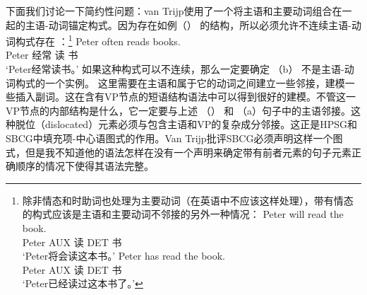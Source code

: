 下面我们讨论一下简约性问题：van Trijp使用了一个将主语和主要动词组合在一起的主语-动词锚定构式。因为存在如例（） 的结构，所以必须允许不连续主语-动词构式存在 ：\footnote{
除非情态和时助词也处理为主要动词（在英语中不应该这样处理），带有情态的构式应该是主语和主要动词不邻接的另外一种情况：
  \eal
  \ex 
\gll Peter will read the book.\\
    Peter AUX 读 DET 书\\
\glt `Peter将会读这本书。'
  \ex 
\gll Peter has read the book.\\
    Peter AUX 读 DET 书\\
\glt `Peter已经读过这本书了。'
  \zllast
} 
\ea
\gll Peter often reads books.\\
     Peter 经常 读 书\\
\glt `Peter经常读书。'
\z
如果这种构式可以不连续，那么一定要确定 （b） 不是主语-动词构式的一个实例。
\eal
{}
\zl
这里需要在主语和属于它的动词之间建立一些邻接，建模一些插入副词。这在含有VP节点的短语结构语法中可以得到很好的建模。不管这一VP节点的内部结构是什么，它一定要与上述  （） 和 （a）句子中的主语邻接。这种脱位（dislocated）元素必须与包含主语和VP的复杂成分邻接。这正是HPSG和SBCG中填充项-中心语图式的作用。Van Trijp批评SBCG必须声明这样一个图式，但是我不知道他的语法怎样在没有一个声明来确定带有前者元素的句子元素正确顺序的情况下使得其语法完整。

